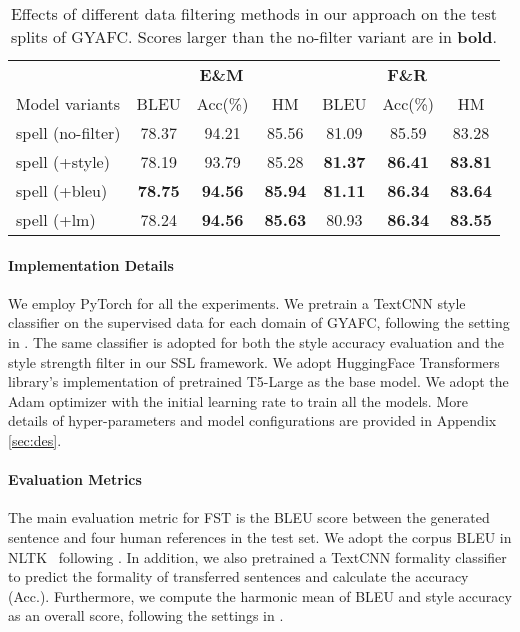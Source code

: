 \begin{table*}[t]
    \centering
    \small
\begin{tabular}{lcccccc}
        \toprule
        & \multicolumn{3}{c}{\textbf{E\&M}} & \multicolumn{3}{c}{\textbf{F\&R}} \\
 \cmidrule(lr){2-4} \cmidrule(lr){5-7} 
     Model variants    & BLEU & Acc(\%)& HM & BLEU & Acc(\%) & HM \\
    
      \midrule
      spell (no-filter)& 78.37 & 94.21 &85.56 & 81.09 &	85.59 &	83.28  \\
      spell (+style) & 78.19 &	93.79 &	85.28 &\textbf{81.37} &	\textbf{86.41} &	\textbf{83.81 }\\
      spell (+bleu) & \textbf{78.75} &	\textbf{94.56} &	\textbf{85.94} &\textbf{81.11 }&	\textbf{86.34} &	\textbf{83.64 }\\
      spell (+lm) & 78.24 &	\textbf{94.56 }&	\textbf{85.63} & 80.93 &	\textbf{86.34} &	\textbf{83.55}\\
        \bottomrule
    \end{tabular}
\caption{Effects of different data filtering methods in our approach on the test splits of GYAFC. Scores larger than the no-filter variant are in \textbf{bold}.}
    \label{tab:filter-res}
\end{table*}
\paragraph{Implementation Details} We employ PyTorch \citep{pytorch} for all the experiments.  We pretrain a TextCNN style classifier on the supervised data for each domain of GYAFC, following the setting in \cite{lai-etal-2021-thank}.
The same classifier is adopted for both the style accuracy evaluation and the style strength filter in our SSL framework. We adopt HuggingFace Transformers \citep{transformers} library's implementation of pretrained T5-Large \citep{2020t5} as the base model. We adopt the Adam \citep{adam} optimizer with the initial learning rate  to train all the models.  More details of hyper-parameters and model configurations are provided in Appendix \ref{sec:des}.





\paragraph{Evaluation Metrics}
The main evaluation metric for FST is the BLEU score between the generated sentence and four human references in the test set. We adopt the corpus BLEU in NLTK~\cite{loper-bird-2002-nltk} following \citep{chawla-yang-2020-semi}. In addition, we also pretrained a TextCNN formality classifier to predict the formality of transferred sentences and calculate the accuracy (Acc.). Furthermore, we compute the harmonic mean of BLEU and style accuracy as an overall score, following the settings in \cite{lai-etal-2021-thank}. 













